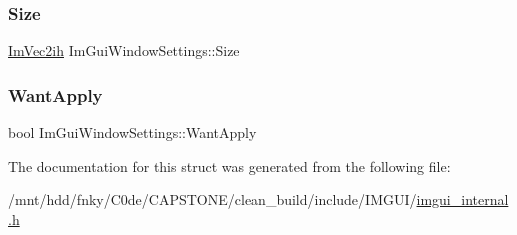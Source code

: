 \mbox{\label{structImGuiWindowSettings_a7e4a26f4e4bfaf97a379641dcdbb6d14}} 
\subsubsection{\texorpdfstring{Size}{Size}}
{\footnotesize\ttfamily \hyperlink{structImVec2ih}{Im\+Vec2ih} Im\+Gui\+Window\+Settings\+::\+Size}

\mbox{\label{structImGuiWindowSettings_a4426a1fdde8c99e0bb2b155a9073de93}} 
\subsubsection{\texorpdfstring{Want\+Apply}{WantApply}}
{\footnotesize\ttfamily bool Im\+Gui\+Window\+Settings\+::\+Want\+Apply}



The documentation for this struct was generated from the following file\+:\begin{DoxyCompactItemize}
\item 
/mnt/hdd/fnky/\+C0de/\+C\+A\+P\+S\+T\+O\+N\+E/clean\+\_\+build/include/\+I\+M\+G\+U\+I/\hyperlink{imgui__internal_8h}{imgui\+\_\+internal.\+h}\end{DoxyCompactItemize}
